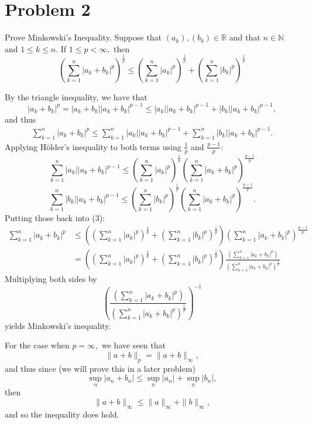 \documentclass[11pt]{article}
\newcommand{\bbN}{\mathbb{N}}
\newcommand{\bbR}{\mathbb{R}}
\begin{document}
\section*{Problem 2}
\begin{problem}
    Prove Minkowski's Inequality. Suppose that $(a_k), (b_k)\in \bbR$ and that $n\in \bbN$ and $1\leq k \leq n.$ If $1 \leq p < \infty,$ then 
    \[\left(\sum_{k=1}^n|a_k + b_k|^p\right)^{\frac{1}{p}} \leq \left(\sum_{k=1}^n|a_k|^p\right)^{\frac{1}{p}} + \left(\sum_{k=1}^n|b_k|^p\right)^{\frac{1}{p}}\]
\end{problem}
\begin{solution}
    By the triangle inequality, we have that 
    \[|a_k + b_k|^p  = |a_k + b_k||a_k + b_k|^{p-1} \leq |a_k||a_k + b_k|^{p-1} + |b_k||a_k + b_k|^{p-1},\] and thus
    \begin{align}
    \sum_{k=1}^n|a_k + b_k|^p  \leq \sum_{k=1}^n|a_k||a_k + b_k|^{p-1} + \sum_{k=1}^n|b_k||a_k + b_k|^{p-1}.    
    \end{align}
     Applying H\"{o}lder's inequality to both terms using $\frac{1}{p}$ and $\frac{p-1}{p}:$
    \[\sum_{k=1}^n|a_k||a_k + b_k|^{p-1} \leq \left(\sum_{k=1}^n |a_k|^p \right)^{\frac{1}{p}}\left(\sum_{k=1}^n|a_k + b_k|^p\right)^{\frac{p-1}{p}}\]
    \[\sum_{k=1}^n|b_k||a_k + b_k|^{p-1} \leq \left(\sum_{k=1}^n |b_k|^p \right)^{\frac{1}{p}}\left(\sum_{k=1}^n|a_k + b_k|^p\right)^{\frac{p-1}{p}}.\] Putting those back into (3):
    \begin{align*}
    \sum_{k=1}^n|a_k + b_k|^p &\leq \left(\left(\sum_{k=1}^n|a_k|^p\right)^{\frac{1}{p}} + \left(\sum_{k=1}^n|b_k|^p\right)^{\frac{1}{p}}\right)\left(\sum_{k=1}^n|a_k + b_k|^p\right)^{\frac{p-1}{p}}\\ &= \left(\left(\sum_{k=1}^n|a_k|^p\right)^{\frac{1}{p}} + \left(\sum_{k=1}^n|b_k|^p\right)^{\frac{1}{p}}\right)\frac{\left(\sum_{k=1}^n|a_k + b_k|^p\right)}{\left(\sum_{k=1}^n|a_k + b_k|^p\right)^{\frac{1}{p}}}    
    \end{align*}
    Multiplying both sides by 
    \[\left(\frac{\left(\sum_{k=1}^n|a_k + b_k|^p\right)}{\left(\sum_{k=1}^n|a_k + b_k|^p\right)^{\frac{1}{p}}}\right)^{-1}\] yields Minkowski's inequality.

    For the case when $p = \infty,$ we have seen that 
    \[\|a+ b\|_p = \|a + b\|_\infty,\] and thus since (we will prove this in a later problem) 
    \[\sup_{n}|a_n + b_n| \leq \sup_n|a_n| + \sup_n|b_n|,\] then 
    \[\|a + b\|_\infty \leq \|a\|_\infty + \|b\|_\infty,\] and so the inequality does hold. 
\end{solution}
\end{document}
